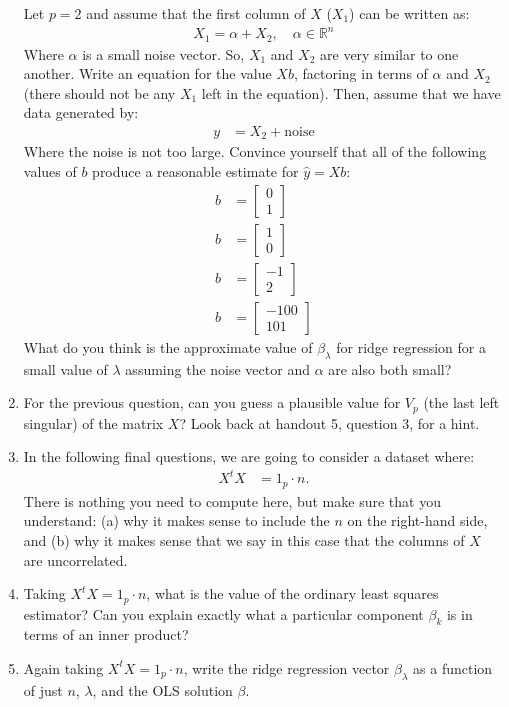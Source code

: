 \documentclass[12pt,hidelinks]{article}
\numberwithin{equation}{section}
\begin{document}
\begin{enumerate}
Let $p=2$ and assume that the first column of $X$ ($X_1$) can be written as:
\begin{align}
X_1 = \alpha + X_2, \quad \alpha \in \mathbb{R}^n
\end{align}
Where $\alpha$ is a small noise vector. So, $X_1$ and $X_2$ are very similar to
one another. Write an equation for the value $X b$, factoring in terms of $\alpha$
and $X_2$ (there should not be any $X_1$ left in the equation). Then, assume that
we have data generated by:
\begin{align}
y &= X_2 + \text{noise}
\end{align}
Where the noise is not too large. Convince yourself that all of the following
values of $b$ produce a reasonable estimate for $\widehat{y} = X b$:
\begin{align}
b &= \begin{bmatrix} 0 \\ 1 \end{bmatrix} \\
b &= \begin{bmatrix} 1 \\ 0 \end{bmatrix} \\
b &= \begin{bmatrix} -1 \\ 2 \end{bmatrix} \\
b &= \begin{bmatrix} -100 \\ 101 \end{bmatrix}
\end{align}
What do you think is the approximate value of $\beta_\lambda$ for ridge
regression for a small value of $\lambda$ assuming the noise vector and $\alpha$
are also both small?
\item For the previous question, can you guess a plausible value for $V_p$
(the last left singular) of the matrix $X$? Look back at handout 5, question 3,
for a hint.
\item In the following final questions, we are going to consider a dataset
where:
\begin{align}
X^t X &= 1_p \cdot n.
\end{align}
There is nothing you need to compute here, but make sure that you understand:
(a) why it makes sense to include the $n$ on the right-hand side, and (b) why
it makes sense that we say in this case that the columns of $X$ are uncorrelated.
\item Taking $X^t X = 1_p \cdot n$, what is the value of the ordinary least
squares estimator? Can you explain exactly what a particular component $\beta_k$
is in terms of an inner product?
\item Again taking $X^t X = 1_p \cdot n$, write the ridge regression vector
$\beta_\lambda$ as a function of just $n$, $\lambda$, and the OLS solution $\beta$.
\end{enumerate}
\end{document}
